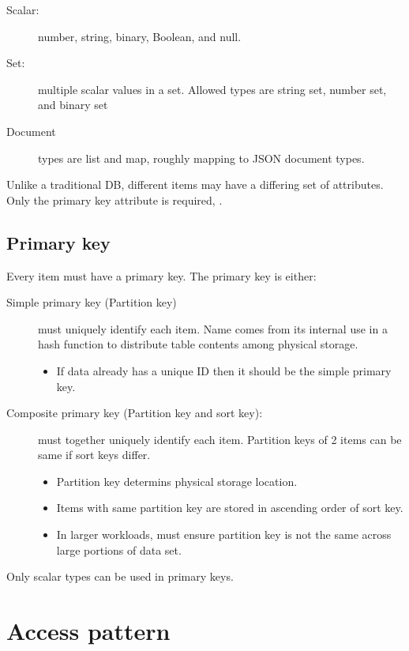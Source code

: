 \documentclass[slides]{pgnotes}
\begin{document}
\begin{description}
\item[Scalar:]
number, string, binary, Boolean, and null.
\item[Set:]
multiple scalar values in a set. Allowed types are string set, number
set, and binary set
\item[Document]
types are list and map, roughly mapping to JSON document types.
\end{description}

Unlike a traditional DB, different items may have a differing set of
attributes. Only the primary key attribute is required, .

\subsection{Primary key}\label{sec:sec:primary-key}

Every item must have a primary key. The primary key is either:

\begin{description}
\item[Simple primary key (Partition key)]
must uniquely identify each item. Name comes from its internal use in a
hash function to distribute table contents among physical storage.

\begin{itemize}
\tightlist
\item
  If data already has a unique ID then it should be the simple primary
  key.
\end{itemize}
\item[Composite primary key (Partition key and sort key):]
must together uniquely identify each item. Partition keys of 2 items can
be same if sort keys differ.

\begin{itemize}
\item
  Partition key determins physical storage location.
\item
  Items with same partition key are stored in ascending order of sort
  key.
\item
  In larger workloads, must ensure partition key is not the same across
  large portions of data set.
\end{itemize}
\end{description}

Only scalar types can be used in primary keys.

\section{Access pattern}\label{sec:access-pattern}
\end{document}

